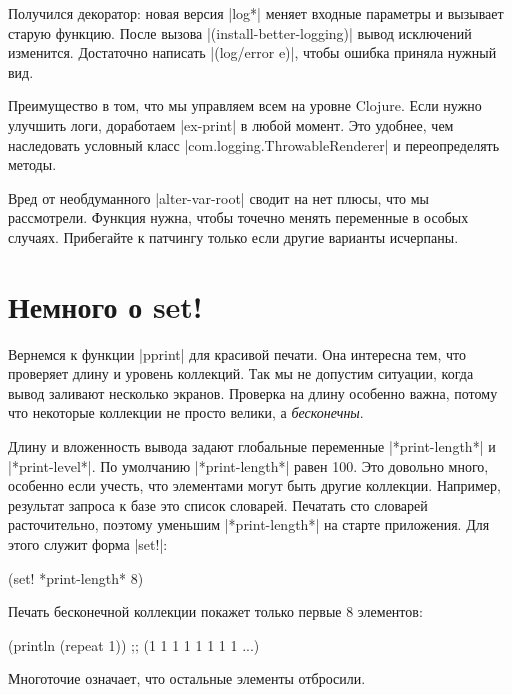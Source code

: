 Получился декоратор: новая версия \spverb|log*| меняет входные параметры и
вызывает старую функцию. После вызова \spverb|(install-better-logging)| вывод
исключений изменится. Достаточно написать \spverb|(log/error e)|, чтобы ошибка
приняла нужный вид.

Преимущество в том, что мы управляем всем на уровне Clojure. Если нужно улучшить
логи, доработаем \spverb|ex-print| в любой момент. Это удобнее, чем наследовать
условный класс \spverb|com.logging.ThrowableRenderer| и переопределять методы.

Вред от необдуманного \spverb|alter-var-root| сводит на нет плюсы, что мы
рассмотрели. Функция нужна, чтобы точечно менять переменные в особых
случаях. Прибегайте к патчингу только если другие варианты исчерпаны.

\section{Немного о set!}

Вернемся к функции \spverb|pprint| для красивой печати. Она интересна тем, что
проверяет длину и уровень коллекций. Так мы не допустим ситуации, когда вывод
заливают несколько экранов. Проверка на длину особенно важна, потому что
некоторые коллекции не просто велики, а \emph{бесконечны}.

Длину и вложенность вывода задают глобальные переменные \spverb|*print-length*|
и \spverb|*print-level*|. По умолчанию \spverb|*print-length*| равен 100. Это
довольно много, особенно если учесть, что элементами могут быть другие
коллекции. Например, результат запроса к базе это список словарей. Печатать сто
словарей расточительно, поэтому уменьшим \spverb|*print-length*| на старте
приложения. Для этого служит форма \spverb|set!|:

\begin{english}
  \begin{clojure}
(set! *print-length* 8)
  \end{clojure}
\end{english}

\noindent
Печать бесконечной коллекции покажет только первые 8 элементов:

\begin{english}
  \begin{clojure}
(println (repeat 1))
;; (1 1 1 1 1 1 1 1 ...)
  \end{clojure}
\end{english}

\noindent
Многоточие означает, что остальные элементы отбросили.

